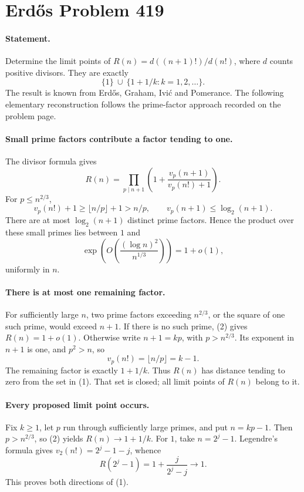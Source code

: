 \section*{Erd\H{o}s Problem 419}

\paragraph{Statement.}
Determine the limit points of \(R(n)=d((n+1)!)/d(n!)\), where \(d\)
counts positive divisors. They are exactly
\[
 \{1\}\ \cup\ \{1+1/k:k=1,2,\ldots\}.
 \tag{1}
\]
The result is known from Erd\H{o}s, Graham, Ivi\'c and Pomerance.
The following elementary reconstruction follows the prime-factor approach
recorded on the problem page.

\paragraph{Small prime factors contribute a factor tending to one.}
The divisor formula gives
\[
 R(n)=\prod_{p\mid n+1}
 \left(1+\frac{v_p(n+1)}{v_p(n!)+1}\right).
\]
For \(p\leq n^{2/3}\),
\[
 v_p(n!)+1\geq\lfloor n/p\rfloor+1>n/p,\qquad
 v_p(n+1)\leq\log_2(n+1).
\]
There are at most \(\log_2(n+1)\) distinct prime factors. Hence the
product over these small primes lies between \(1\) and
\[
 \exp\left(O\left(\frac{(\log n)^2}{n^{1/3}}\right)\right)=1+o(1),
 \tag{2}
\]
uniformly in \(n\).

\paragraph{There is at most one remaining factor.}
For sufficiently large \(n\), two prime factors exceeding \(n^{2/3}\),
or the square of one such prime, would exceed \(n+1\).
If there is no such prime, (2) gives \(R(n)=1+o(1)\).
Otherwise write \(n+1=kp\), with \(p>n^{2/3}\).
Its exponent in \(n+1\) is one, and \(p^2>n\), so
\[
 v_p(n!)=\lfloor n/p\rfloor=k-1.
\]
The remaining factor is exactly \(1+1/k\). Thus \(R(n)\) has distance
tending to zero from the set in (1). That set is closed; all limit
points of \(R(n)\) belong to it.

\paragraph{Every proposed limit point occurs.}
Fix \(k\geq1\), let \(p\) run through sufficiently large primes, and put
\(n=kp-1\). Then \(p>n^{2/3}\), so (2) yields \(R(n)\to1+1/k\).
For \(1\), take \(n=2^j-1\). Legendre's formula gives
\(v_2(n!)=2^j-1-j\), whence
\[
 R(2^j-1)=1+\frac{j}{2^j-j}\longrightarrow1.
\]
This proves both directions of (1).

